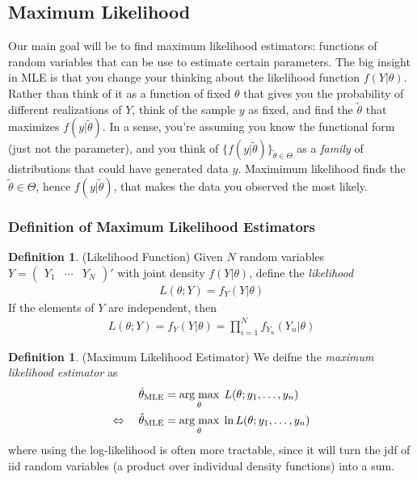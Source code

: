 \documentclass[12pt]{article}
\theoremstyle{plain}
\theoremstyle{definition}
\newtheorem{defn}[thm]{Definition}
\theoremstyle{remark}
\DeclareMathOperator*{\argmax}{arg\;max}
\newcommand{\prodiN}{\prod^N_{i=1}}
\begin{document}
\subsection{Maximum Likelihood}

Our main goal will be to find maximum likelihood estimators: functions
of random variables that can be use to estimate certain parameters.  The
big insight in MLE is that you change your thinking about the likelihood
function $f(Y|\theta)$. Rather than think of it as a function of fixed
$\theta$ that gives you the probability of different realizations of
$Y$, think of the sample $y$ as fixed, and find the $\tilde{\theta}$
that maximizes $f(y|\tilde{\theta})$. In a sense, you're assuming you
know the functional form (just not the parameter), and you think of
$\{f(y|\tilde{\theta})\}_{\tilde{\theta}\in\Theta}$
as a \emph{family} of distributions that could have generated data $y$.
Maximimum likelihood finds the $\tilde{\theta}\in \Theta$, hence
$f(y|\tilde{\theta})$, that makes the data you observed the most likely.

\subsubsection{Definition of Maximum Likelihood Estimators}

\begin{defn}(Likelihood Function)
Given $N$ random variables
$Y=\begin{pmatrix}Y_1&\cdots &Y_N\end{pmatrix}'$
with joint density $f(Y|\theta)$, define the \emph{likelihood}
\begin{align*}
  L(\theta; Y) = f_Y(Y|\theta)
\end{align*}
If the elements of $Y$ are independent, then
\begin{align*}
  L(\theta; Y) = f_Y(Y|\theta)
  = \prodiN f_{Y_n}(Y_{n}|\theta)
\end{align*}
\end{defn}

\begin{defn}(Maximum Likelihood Estimator)
We deifne the \emph{maximum likelihood estimator} as
\begin{align}
   \label{mlelik}
    \hat{\theta}_{\text{MLE}} &=
   \argmax_\theta \; L(\theta; y_1, \ldots, y_n) \\
   \Leftrightarrow\quad
    \hat{\theta}_{\text{MLE}} &=
   \argmax_\theta \; \ln L(\theta; y_1, \ldots, y_n) \notag
\end{align}
where using the log-likelihood is often more tractable, since
it will turn the jdf of iid random variables (a product over individual
density functions) into a sum.
\end{defn}
\end{document}
